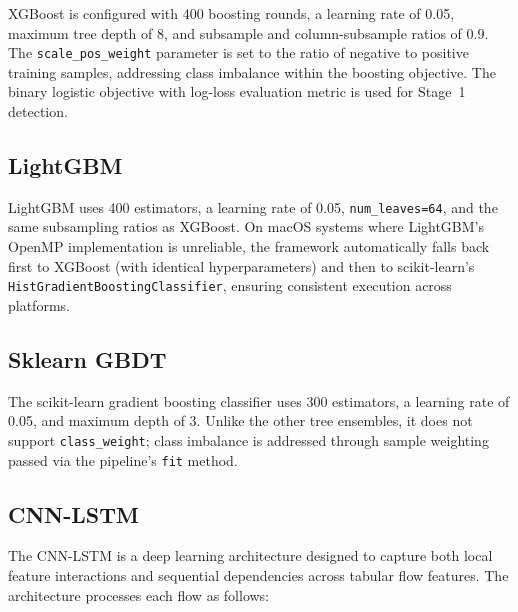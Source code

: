 \documentclass[12pt,a4paper]{report}
\begin{document}
XGBoost is configured with 400 boosting rounds, a learning rate of 0.05, maximum tree depth of 8, and subsample and column-subsample ratios of 0.9. The \texttt{scale\_pos\_weight} parameter is set to the ratio of negative to positive training samples, addressing class imbalance within the boosting objective. The binary logistic objective with log-loss evaluation metric is used for Stage~1 detection.

\subsection{LightGBM}
\label{sec:lightgbm}

LightGBM uses 400 estimators, a learning rate of 0.05, \texttt{num\_leaves=64}, and the same subsampling ratios as XGBoost. On macOS systems where LightGBM's OpenMP implementation is unreliable, the framework automatically falls back first to XGBoost (with identical hyperparameters) and then to scikit-learn's \texttt{HistGradientBoostingClassifier}, ensuring consistent execution across platforms.

\subsection{Sklearn GBDT}
\label{sec:gbdt}

The scikit-learn gradient boosting classifier uses 300 estimators, a learning rate of 0.05, and maximum depth of 3. Unlike the other tree ensembles, it does not support \texttt{class\_weight}; class imbalance is addressed through sample weighting passed via the pipeline's \texttt{fit} method.

\subsection{CNN-LSTM}
\label{sec:cnnlstm}

The CNN-LSTM is a deep learning architecture designed to capture both local feature interactions and sequential dependencies across tabular flow features. The architecture processes each flow as follows:
\end{document}
